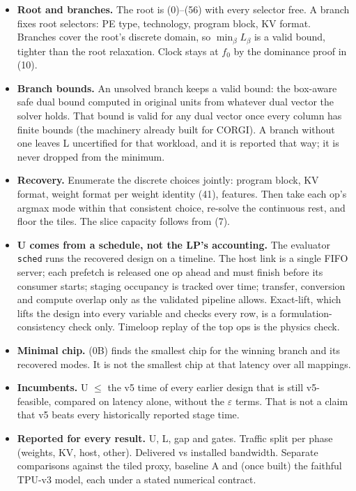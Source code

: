 \documentclass[10pt]{article}
\renewcommand{\_}{\textunderscore\allowbreak}
\begin{document}
\begin{itemize}
 \item \textbf{Root and branches.} The root is (0)--(56) with every selector free. A branch fixes root selectors: PE type, technology, program block, KV format. Branches cover the root's discrete domain, so $\min_\beta L_\beta$ is a valid bound, tighter than the root relaxation. Clock stays at $f_0$ by the dominance proof in (10).
 \item \textbf{Branch bounds.} An unsolved branch keeps a valid bound: the box-aware safe dual bound computed in original units from whatever dual vector the solver holds. That bound is valid for any dual vector once every column has finite bounds (the machinery already built for CORGI). A branch without one leaves L uncertified for that workload, and it is reported that way; it is never dropped from the minimum.
 \item \textbf{Recovery.} Enumerate the discrete choices jointly: program block, KV format, weight format per weight identity (41), features. Then take each op's argmax mode within that consistent choice, re-solve the continuous rest, and floor the tiles. The slice capacity follows from (7).
 \item \textbf{U comes from a schedule, not the LP's accounting.} The evaluator \texttt{sched} runs the recovered design on a timeline. The host link is a single FIFO server; each prefetch is released one op ahead and must finish before its consumer starts; staging occupancy is tracked over time; transfer, conversion and compute overlap only as the validated pipeline allows. Exact-lift, which lifts the design into every variable and checks every row, is a formulation-consistency check only. Timeloop replay of the top ops is the physics check.
 \item \textbf{Minimal chip.} (0B) finds the smallest chip for the winning branch and its recovered modes. It is not the smallest chip at that latency over all mappings.
 \item \textbf{Incumbents.} U $\le$ the v5 time of every earlier design that is still v5-feasible, compared on latency alone, without the $\varepsilon$ terms. That is not a claim that v5 beats every historically reported stage time.
 \item \textbf{Reported for every result.} U, L, gap and gates. Traffic split per phase (weights, KV, host, other). Delivered vs installed bandwidth. Separate comparisons against the tiled proxy, baseline A and (once built) the faithful TPU-v3 model, each under a stated numerical contract.
 
\end{itemize}
 
\end{document}
